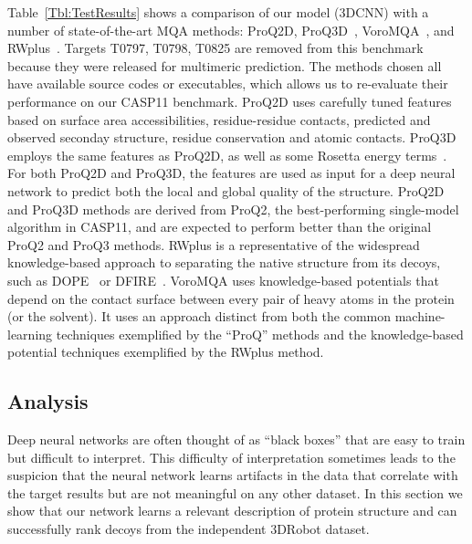 \documentclass{bioinfo}
\begin{document}
Table~\ref{Tbl:TestResults} shows a comparison of our model (3DCNN)
with a number of state-of-the-art MQA methods: ProQ2D,
ProQ3D~\citep{uziela2017proq3d},
VoroMQA~\citep{olechnovivc2017voromqa}, and
RWplus~\citep{zhang2010novel}. Targets T0797, T0798, T0825 are removed
from this benchmark because they were released for multimeric
prediction.
%
The methods chosen all have available source codes or executables,
which allows us to re-evaluate their performance on our CASP11
benchmark.
%
ProQ2D uses carefully tuned features based on surface area
accessibilities, residue-residue contacts, predicted and observed
seconday structure, residue conservation and atomic contacts. ProQ3D
employs the same features as ProQ2D, as well as some Rosetta energy
terms~\citep{leaverfay2011rosetta}. For both ProQ2D and ProQ3D, the
features are used as input for a deep neural network to predict both
the local and global quality of the structure.
ProQ2D and ProQ3D methods are derived from ProQ2, the best-performing
single-model algorithm in CASP11, and are expected to perform better
than the original ProQ2 and ProQ3 methods.
%
RWplus is a representative of the widespread knowledge-based approach
to separating the native structure from its decoys, such as
DOPE~\citep{shen2006statistical}  or DFIRE~\citep{zhou2002distance}.
%
VoroMQA uses knowledge-based potentials that depend on the contact
surface between every pair of heavy atoms in the protein (or the
solvent). It uses an approach distinct from both the common
machine-learning techniques exemplified by the ``ProQ'' methods and
the knowledge-based potential techniques exemplified by the RWplus
method.
%
%
\subsection{Analysis}
%
Deep neural networks are often thought of as ``black boxes'' that are
easy to train but difficult to interpret. This difficulty of
interpretation sometimes leads to the suspicion that the neural
network learns artifacts in the data that correlate with the target
results but are not meaningful on any other dataset.
%
In this section we show that our network learns a relevant
description of protein structure and can successfully rank decoys from
the independent 3DRobot dataset.
\end{document}
